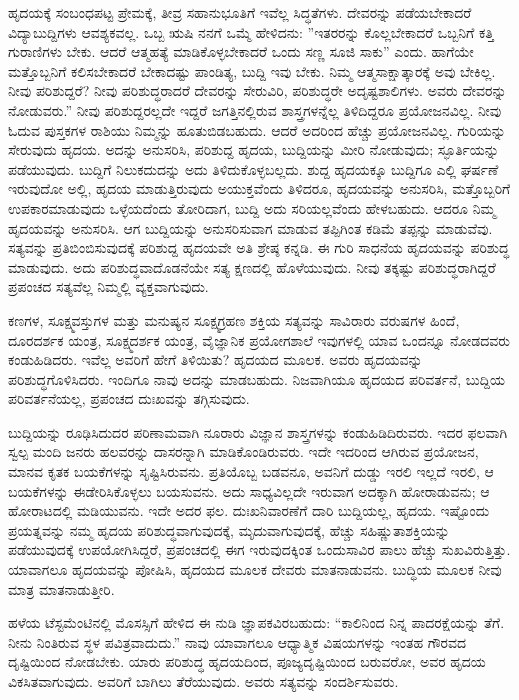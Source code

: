 ಹೃದಯಕ್ಕೆ ಸಂಬಂಧಪಟ್ಟ ಪ್ರೇಮಕ್ಕೆ, ತೀವ್ರ ಸಹಾನುಭೂತಿಗೆ ಇವೆಲ್ಲ ಸಿದ್ಧತೆಗಳು. ದೇವರನ್ನು ಪಡೆಯಬೇಕಾದರೆ ವಿದ್ಯಾಬುದ್ದಿಗಳು ಆವಶ್ಯಕವಲ್ಲ. ಒಬ್ಬ ಋಷಿ ನನಗೆ ಒಮ್ಮೆ ಹೇಳಿದನು: ''ಇತರರನ್ನು ಕೊಲ್ಲಬೇಕಾದರೆ ಒಬ್ಬನಿಗೆ ಕತ್ತಿ ಗುರಾಣಿಗಳು ಬೇಕು. ಆದರೆ ಆತ್ಮಹತ್ಯೆ ಮಾಡಿಕೊಳ್ಳಬೇಕಾದರೆ ಒಂದು ಸಣ್ಣ ಸೂಜಿ ಸಾಕು” ಎಂದು. ಹಾಗೆಯೇ ಮತ್ತೊಬ್ಬನಿಗೆ ಕಲಿಸಬೇಕಾದರೆ ಬೇಕಾದಷ್ಟು ಪಾಂಡಿತ್ಯ, ಬುದ್ದಿ ಇವು ಬೇಕು. ನಿಮ್ಮ ಆತ್ಮಸಾಕ್ಷಾತ್ಕಾರಕ್ಕೆ ಅವು ಬೇಕಿಲ್ಲ. ನೀವು ಪರಿಶುದ್ದರೆ? ನೀವು ಪರಿಶುದ್ಧರಾದರೆ ದೇವರನ್ನು ಸೇರುವಿರಿ, ಪರಿಶುದ್ಧರೇ ಅದೃಷ್ಟಶಾಲಿಗಳು. ಅವರು ದೇವರನ್ನು ನೋಡುವರು.” ನೀವು ಪರಿಶುದ್ದರಲ್ಲದೇ ಇದ್ದರೆ ಜಗತ್ತಿನಲ್ಲಿರುವ ಶಾಸ್ತ್ರಗಳನ್ನೆಲ್ಲ ತಿಳಿದಿದ್ದರೂ ಪ್ರಯೋಜನವಿಲ್ಲ. ನೀವು ಓದುವ ಪುಸ್ತಕಗಳ ರಾಶಿಯು ನಿಮ್ಮನ್ನು ಹೂತುಬಿಡಬಹುದು. ಆದರೆ ಅದರಿಂದ ಹೆಚ್ಚು ಪ್ರಯೋಜನವಿಲ್ಲ. ಗುರಿಯನ್ನು ಸೇರುವುದು ಹೃದಯ. ಅದನ್ನು ಅನುಸರಿಸಿ, ಪರಿಶುದ್ದ ಹೃದಯ, ಬುದ್ದಿಯನ್ನು ಮೀರಿ ನೋಡುವುದು; ಸ್ಫೂರ್ತಿಯನ್ನು ಪಡೆಯುವುದು. ಬುದ್ದಿಗೆ ನಿಲುಕದುದನ್ನು ಅದು ತಿಳಿದುಕೊಳ್ಳಬಲ್ಲದು. ಶುದ್ದ ಹೃದಯಕ್ಕೂ ಬುದ್ದಿಗೂ ಎಲ್ಲಿ ಘರ್ಷಣೆ ಇರುವುದೋ ಅಲ್ಲಿ, ಹೃದಯ ಮಾಡುತ್ತಿರುವುದು ಅಯುಕ್ತವೆಂದು ತಿಳಿದರೂ, ಹೃದಯವನ್ನು ಅನುಸರಿಸಿ, ಮತ್ತೊಬ್ಬರಿಗೆ ಉಪಕಾರಮಾಡುವುದು ಒಳ್ಳೆಯದೆಂದು ತೋರಿದಾಗ, ಬುದ್ದಿ ಅದು ಸರಿಯಲ್ಲವೆಂದು ಹೇಳಬಹುದು. ಆದರೂ ನಿಮ್ಮ ಹೃದಯವನ್ನು ಅನುಸರಿಸಿ. ಆಗ ಬುದ್ದಿಯನ್ನು ಅನುಸರಿಸುವಾಗ ಮಾಡುವ ತಪ್ಪಿಗಿಂತ ಕಡಿಮೆ ತಪ್ಪನ್ನು ಮಾಡುವೆವು. ಸತ್ಯವನ್ನು ಪ್ರತಿಬಿಂಬಿಸುವುದಕ್ಕೆ ಪರಿಶುದ್ದ ಹೃದಯವೇ ಅತಿ ಶ್ರೇಷ್ಠ ಕನ್ನಡಿ. ಈ ಗುರಿ ಸಾಧನೆಯ ಹೃದಯವನ್ನು ಪರಿಶುದ್ಧ ಮಾಡುವುದು. ಅದು ಪರಿಶುದ್ಧವಾದೊಡನೆಯೇ ಸತ್ಯ ಕ್ಷಣದಲ್ಲಿ ಹೊಳೆಯುವುದು. ನೀವು ತಕ್ಕಷ್ಟು ಪರಿಶುದ್ಧರಾಗಿದ್ದರೆ ಪ್ರಪಂಚದ ಸತ್ಯವೆಲ್ಲ ನಿಮ್ಮಲ್ಲಿ ವ್ಯಕ್ತವಾಗುವುದು.

ಕಣಗಳ, ಸೂಕ್ಷ್ಮವಸ್ತುಗಳ ಮತ್ತು ಮನುಷ್ಯನ ಸೂಕ್ಷ್ಮಗ್ರಹಣ ಶಕ್ತಿಯ ಸತ್ಯವನ್ನು ಸಾವಿರಾರು ವರುಷಗಳ ಹಿಂದೆ, ದೂರದರ್ಶಕ ಯಂತ್ರ, ಸೂಕ್ಷ್ಮದರ್ಶಕ ಯಂತ್ರ, ವೈಜ್ಞಾನಿಕ ಪ್ರಯೋಗಶಾಲೆ ಇವುಗಳಲ್ಲಿ ಯಾವ ಒಂದನ್ನೂ ನೋಡದವರು ಕಂಡುಹಿಡಿದರು. ಇವೆಲ್ಲ ಅವರಿಗೆ ಹೇಗೆ ತಿಳಿಯಿತು? ಹೃದಯದ ಮೂಲಕ. ಅವರು ಹೃದಯವನ್ನು ಪರಿಶುದ್ಧಗೊಳಿಸಿದರು. ಇಂದಿಗೂ ನಾವು ಅದನ್ನು ಮಾಡಬಹುದು. ನಿಜವಾಗಿಯೂ ಹೃದಯದ ಪರಿವರ್ತನೆ, ಬುದ್ದಿಯ ಪರಿವರ್ತನೆಯಲ್ಲ, ಪ್ರಪಂಚದ ದುಃಖವನ್ನು ತಗ್ಗಿಸುವುದು.

ಬುದ್ದಿಯನ್ನು ರೂಢಿಸಿದುದರ ಪರಿಣಾಮವಾಗಿ ನೂರಾರು ವಿಜ್ಞಾನ ಶಾಸ್ತ್ರಗಳನ್ನು ಕಂಡುಹಿಡಿದಿರುವರು. ಇದರ ಫಲವಾಗಿ ಸ್ವಲ್ಪ ಮಂದಿ ಜನರು ಹಲವರನ್ನು ದಾಸರನ್ನಾಗಿ ಮಾಡಿಕೊಂಡಿರುವರು. ಇದೇ ಇದರಿಂದ ಆಗಿರುವ ಪ್ರಯೋಜನ, ಮಾನವ ಕೃತಕ ಬಯಕೆಗಳನ್ನು ಸೃಷ್ಟಿಸಿರುವನು. ಪ್ರತಿಯೊಬ್ಬ ಬಡವನೂ, ಅವನಿಗೆ ದುಡ್ಡು ಇರಲಿ ಇಲ್ಲದೆ ಇರಲಿ, ಆ ಬಯಕೆಗಳನ್ನು ಈಡೇರಿಸಿಕೊಳ್ಳಲು ಬಯಸುವನು. ಅದು ಸಾಧ್ಯವಿಲ್ಲದೇ ಇರುವಾಗ ಅದಕ್ಕಾಗಿ ಹೋರಾಡುವನು; ಆ ಹೋರಾಟದಲ್ಲಿ ಮಡಿಯುವನು. ಇದೇ ಅದರ ಫಲ. ದುಃಖನಿವಾರಣೆಗೆ ದಾರಿ ಬುದ್ದಿಯಲ್ಲ, ಹೃದಯ. ಇಷ್ಟೊಂದು ಪ್ರಯತ್ನವನ್ನು ನಮ್ಮ ಹೃದಯ ಪರಿಶುದ್ಧವಾಗುವುದಕ್ಕೆ, ಮೃದುವಾಗುವುದಕ್ಕೆ, ಹೆಚ್ಚು ಸಹಿಷ್ಣುತಾಶಕ್ತಿಯನ್ನು ಪಡೆಯುವುದಕ್ಕೆ ಉಪಯೋಗಿಸಿದ್ದರೆ, ಪ್ರಪಂಚದಲ್ಲಿ ಈಗ ಇರುವುದಕ್ಕಿಂತ ಒಂದುಸಾವಿರ ಪಾಲು ಹೆಚ್ಚು ಸುಖವಿರುತ್ತಿತ್ತು. ಯಾವಾಗಲೂ ಹೃದಯವನ್ನು ಪೋಷಿಸಿ, ಹೃದಯದ ಮೂಲಕ ದೇವರು ಮಾತನಾಡುವನು. ಬುದ್ಧಿಯ ಮೂಲಕ ನೀವು ಮಾತ್ರ ಮಾತನಾಡುತ್ತೀರಿ.

ಹಳೆಯ ಟೆಸ್ಟಮೆಂಟಿನಲ್ಲಿ ಮೊಸಸ್ಸಿಗೆ ಹೇಳಿದ ಈ ನುಡಿ ಜ್ಞಾಪಕವಿರಬಹುದು: “ಕಾಲಿನಿಂದ ನಿನ್ನ ಪಾದರಕ್ಷೆಯನ್ನು ತೆಗೆ. ನೀನು ನಿಂತಿರುವ ಸ್ಥಳ ಪವಿತ್ರವಾದುದು.'' ನಾವು ಯಾವಾಗಲೂ ಆಧ್ಯಾತ್ಮಿಕ ವಿಷಯಗಳನ್ನು ಇಂತಹ ಗೌರವದ ದೃಷ್ಟಿಯಿಂದ ನೋಡಬೇಕು. ಯಾರು ಪರಿಶುದ್ಧ ಹೃದಯದಿಂದ, ಪೂಜ್ಯದೃಷ್ಟಿಯಿಂದ ಬರುವರೋ, ಅವರ ಹೃದಯ ವಿಕಸಿತವಾಗುವುದು. ಅವರಿಗೆ ಬಾಗಿಲು ತೆರೆಯುವುದು. ಅವರು ಸತ್ಯವನ್ನು ಸಂದರ್ಶಿಸುವರು.

